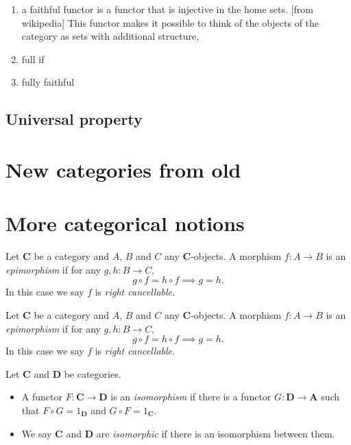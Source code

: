 \begin{definition}
    \begin{enumerate}[label=(\roman*)]
        \item a faithful functor is a functor that is injective in the home sets. [from wikipedia] This functor makes it possible to think of the objects of the category as sets with additional structure,
        \item full if 
        \item fully faithful
    \end{enumerate}
     
    
    
\end{definition}





\subsection{Universal property}


\section{New categories from old}


\section{More categorical notions}

\begin{definition}[Monos]
    Let \(\mathbf{C}\) be a category and \(A\), \(B\) and \(C\) any   \(\mathbf{C}\)-objects.
    A morphism \(f\colon A\to B\) is an \textit{epimorphism} if for any \(g,h\colon B\to C\), \[g\circ f = h\circ f \implies g=h.\]
    In this case we say \(f\) is \textit{right cancellable}.
\end{definition}


\begin{definition}[Epis]
    Let \(\mathbf{C}\) be a category and \(A\), \(B\) and \(C\) any   \(\mathbf{C}\)-objects.
    A morphism \(f\colon A\to B\) is an \textit{epimorphism} if for any \(g,h\colon B\to C\), \[g\circ f = h\circ f \implies g=h.\]
    In this case we say \(f\) is \textit{right cancellable}.
\end{definition}

\begin{definition}[Isomorphism]
    Let \(\mathbf{C}\) and \(\mathbf{D}\) be categories.
    \begin{itemize}[]
        \item A functor \(F\colon \mathbf{C}\to \mathbf{D}\) is an \textit{isomorphism} if there is a functor \(G\colon \mathbf{D}\to \mathbf{A}\) such that \(F\circ G = 1_{\mathbf{D}}\) and \(G\circ F = 1_{\mathbf{C}}\).
        \item We say \(\mathbf{C}\) and \(\mathbf{D}\) are \textit{isomorphic} if there is an isomorphism between them.
    \end{itemize}
    
    
\end{definition}





